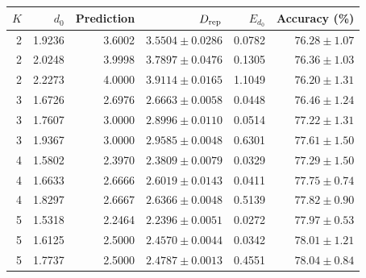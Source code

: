 \begin{tabular}{rrrrrr}
\toprule
$K$ & $d_0$ & Prediction & $D_{\rm rep}$ & $E_{d_0}$ & Accuracy (\%) \\
\midrule
2 & 1.9236 & 3.6002 & $3.5504\pm0.0286$ & 0.0782 & $76.28\pm1.07$ \\
2 & 2.0248 & 3.9998 & $3.7897\pm0.0476$ & 0.1305 & $76.36\pm1.03$ \\
2 & 2.2273 & 4.0000 & $3.9114\pm0.0165$ & 1.1049 & $76.20\pm1.31$ \\
3 & 1.6726 & 2.6976 & $2.6663\pm0.0058$ & 0.0448 & $76.46\pm1.24$ \\
3 & 1.7607 & 3.0000 & $2.8996\pm0.0110$ & 0.0514 & $77.22\pm1.31$ \\
3 & 1.9367 & 3.0000 & $2.9585\pm0.0048$ & 0.6301 & $77.61\pm1.50$ \\
4 & 1.5802 & 2.3970 & $2.3809\pm0.0079$ & 0.0329 & $77.29\pm1.50$ \\
4 & 1.6633 & 2.6666 & $2.6019\pm0.0143$ & 0.0411 & $77.75\pm0.74$ \\
4 & 1.8297 & 2.6667 & $2.6366\pm0.0048$ & 0.5139 & $77.82\pm0.90$ \\
5 & 1.5318 & 2.2464 & $2.2396\pm0.0051$ & 0.0272 & $77.97\pm0.53$ \\
5 & 1.6125 & 2.5000 & $2.4570\pm0.0044$ & 0.0342 & $78.01\pm1.21$ \\
5 & 1.7737 & 2.5000 & $2.4787\pm0.0013$ & 0.4551 & $78.04\pm0.84$ \\
\bottomrule
\end{tabular}
